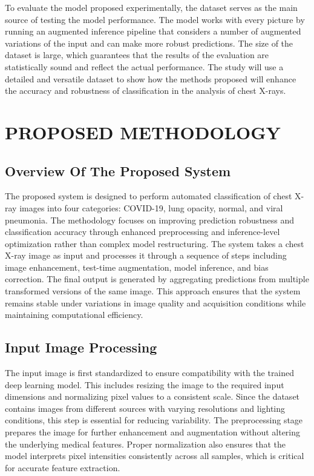 \documentclass[a4paper,fleqn]{cas-dc}
\begin{document}
To evaluate the model proposed experimentally, the dataset serves as the main source of testing the model performance. The model works with every picture by running an augmented inference pipeline that considers a number of augmented variations of the input and can make more robust predictions. The size of the dataset is large, which guarantees that the results of the evaluation are statistically sound and reflect the actual performance. The study will use a detailed and versatile dataset to show how the methods proposed will enhance the accuracy and robustness of classification in the analysis of chest X-rays.                  

\section{PROPOSED METHODOLOGY}

\subsection{Overview Of The Proposed System}
The proposed system is designed to perform automated classification of chest X-ray images into four categories: COVID-19, lung opacity, normal, and viral pneumonia. The methodology focuses on improving prediction robustness and classification accuracy through enhanced preprocessing and inference-level optimization rather than complex model restructuring. The system takes a chest X-ray image as input and processes it through a sequence of steps including image enhancement, test-time augmentation, model inference, and bias correction. The final output is generated by aggregating predictions from multiple transformed versions of the same image. This approach ensures that the system remains stable under variations in image quality and acquisition conditions while maintaining computational efficiency.

\subsection{Input Image Processing}
The input image is first standardized to ensure compatibility with the trained deep learning model. This includes resizing the image to the required input dimensions and normalizing pixel values to a consistent scale. Since the dataset contains images from different sources with varying resolutions and lighting conditions, this step is essential for reducing variability. The preprocessing stage prepares the image for further enhancement and augmentation without altering the underlying medical features. Proper normalization also ensures that the model interprets pixel intensities consistently across all samples, which is critical for accurate feature extraction.
\end{document}
